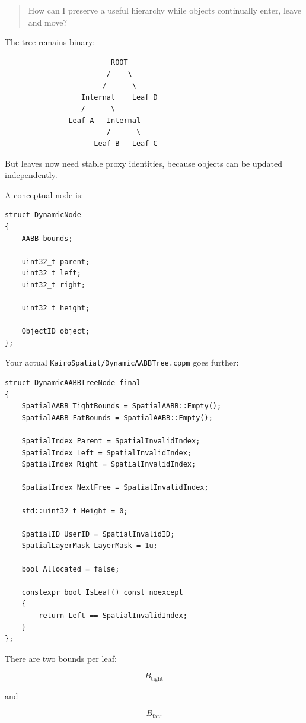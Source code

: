 \begin{quote}
How can I preserve a useful hierarchy while objects continually enter, leave and move?
\end{quote}

The tree remains binary:

\begin{verbatim}
                         ROOT
                        /    \
                       /      \
                  Internal    Leaf D
                  /      \
               Leaf A   Internal
                        /      \
                     Leaf B   Leaf C
\end{verbatim}

But leaves now need stable proxy identities, because objects can be updated independently.

A conceptual node is:

\begin{verbatim}
struct DynamicNode
{
    AABB bounds;

    uint32_t parent;
    uint32_t left;
    uint32_t right;

    uint32_t height;

    ObjectID object;
};
\end{verbatim}

Your actual \texttt{KairoSpatial/DynamicAABBTree.cppm} goes further:

\begin{verbatim}
struct DynamicAABBTreeNode final
{
    SpatialAABB TightBounds = SpatialAABB::Empty();
    SpatialAABB FatBounds = SpatialAABB::Empty();

    SpatialIndex Parent = SpatialInvalidIndex;
    SpatialIndex Left = SpatialInvalidIndex;
    SpatialIndex Right = SpatialInvalidIndex;

    SpatialIndex NextFree = SpatialInvalidIndex;

    std::uint32_t Height = 0;

    SpatialID UserID = SpatialInvalidID;
    SpatialLayerMask LayerMask = 1u;

    bool Allocated = false;

    constexpr bool IsLeaf() const noexcept
    {
        return Left == SpatialInvalidIndex;
    }
};
\end{verbatim}

There are two bounds per leaf:

\[
B_{\text{tight}}
\]

and

\[
B_{\text{fat}}.
\]

